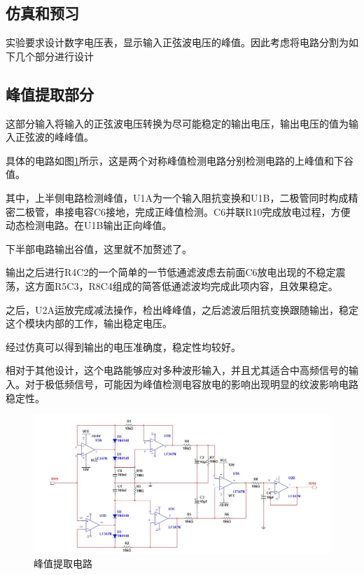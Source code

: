\documentclass[UTF8,a4paper,landscape,16pt]{paper}
\begin{document}
\small
\begin{multicols}{4}
\section{仿真和预习}
\noindent 实验要求设计数字电压表，显示输入正弦波电压的峰值。因此考虑将电路分割为如下几个部分进行设计
\subsection{峰值提取部分}
\noindent 这部分输入将输入的正弦波电压转换为尽可能稳定的输出电压，输出电压的值为输入正弦波的峰峰值。

\noindent 具体的电路如图\ref{PP}所示，这是两个对称峰值检测电路分别检测电路的上峰值和下谷值。

\noindent 其中，上半侧电路检测峰值，U1A为一个输入阻抗变换和U1B，二极管同时构成精密二极管，串接电容C6接地，完成正峰值检测。C6并联R10完成放电过程，方便动态检测电路。在U1B输出正向峰值。

\noindent 下半部电路输出谷值，这里就不加赘述了。

\noindent 输出之后进行R4C2的一个简单的一节低通滤波虑去前面C6放电出现的不稳定震荡，这方面R5C3，R8C4组成的简答低通滤波均完成此项内容，且效果稳定。

\noindent 之后，U2A运放完成减法操作，检出峰峰值，之后滤波后阻抗变换跟随输出，稳定这个模块内部的工作，输出稳定电压。

\noindent 经过仿真可以得到输出的电压准确度，稳定性均较好。

\noindent 相对于其他设计，这个电路能够应对多种波形输入，并且尤其适合中高频信号的输入。对于极低频信号，可能因为峰值检测电容放电的影响出现明显的纹波影响电路稳定性。

\begin{figure}[H]\centering
\includegraphics[width=\columnwidth]{PP.jpg}
\caption{峰值提取电路}\label{PP}
\end{figure}

\end{multicols}
\end{document}

